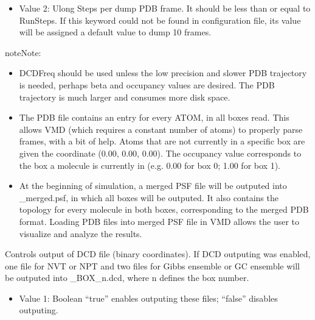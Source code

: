 \documentclass[letterpaper,10pt,english]{sphinxmanual}
\begin{document}
\begin{description}
\begin{itemize}
\item {} 
\sphinxAtStartPar
Value 2: Ulong \sphinxhyphen{} Steps per dump PDB frame. It should be less than or equal to RunSteps. If this
keyword could not be found in configuration file, its value will be assigned a default value to dump 10 frames.

\end{itemize}

\begin{sphinxadmonition}{note}{Note:}\begin{itemize}
\item {} 
\sphinxAtStartPar
DCDFreq should be used unless the low precision and slower PDB trajectory is needed,
perhaps beta and occupancy values are desired.  The PDB trajectory is much larger and consumes more disk space.

\item {} 
\sphinxAtStartPar
The PDB file contains an entry for every ATOM, in all boxes read. This allows VMD (which requires a
constant number of atoms) to properly parse frames, with a bit of help. Atoms that are not currently
in a specific box are given the coordinate (0.00, 0.00, 0.00). The occupancy value corresponds to the
box a molecule is currently in (e.g. 0.00 for box 0; 1.00 for box 1).

\item {} 
\sphinxAtStartPar
At the beginning of simulation, a merged PSF file will be outputed into \_merged.psf,
in which all boxes will be outputed. It also contains the topology for every molecule in both boxes,
corresponding to the merged PDB format. Loading PDB files into merged PSF file in VMD allows the user
to visualize and analyze the results.

\end{itemize}
\end{sphinxadmonition}

\item[{\sphinxcode{\sphinxupquote{DCDFreq}}}] \leavevmode
\sphinxAtStartPar
Controls output of DCD file (binary coordinates). If DCD outputing was enabled, one file for NVT or NPT and
two files for Gibbs ensemble or GC ensemble will be outputed into \_BOX\_n.dcd, where n defines the box number.
\begin{itemize}
\item {} 
\sphinxAtStartPar
Value 1: Boolean \sphinxhyphen{} “true” enables outputing these files; “false” disables outputing.


\end{itemize}
\end{description}
\end{document}
